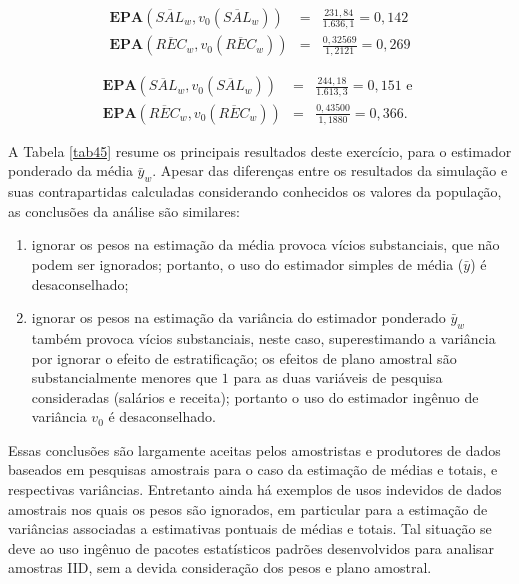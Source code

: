 \documentclass[]{book}
\numberwithin{example}{chapter}
\numberwithin{remark}{chapter}
\numberwithin{definition}{chapter}
\begin{document}
\begin{eqnarray*}
\mathbf{EPA}\left(\overline{SAL}_{w},v_{0}\left(\overline{SAL}_{w}\right)\right) &=&\frac{231,84}{1.636,1}=0,142 \\
\mathbf{EPA}\left( \overline{REC}_{w},v_{0}\left( \overline{REC}_{w}\right)
\right) &=&\frac{0,32569}{1,2121}=0,269
\end{eqnarray*}

\begin{eqnarray*}
\mathbf{EPA}\left( \overline{SAL}_{w},v_{0}\left( \overline{SAL}_{w}\right)
\right) &=&\frac{244,18}{1.613,3}=0,151\mbox{ e } \\
\mathbf{EPA}\left( \overline{REC}_{w},v_{0}\left( \overline{REC}_{w}\right)
\right) &=&\frac{0,43500}{1,1880}=0,366.
\end{eqnarray*}

A Tabela \ref{tab45} resume os principais resultados deste exercício,
para o estimador ponderado da média \(\bar{y}_{w}\). Apesar das
diferenças entre os resultados da simulação e suas contrapartidas
calculadas considerando conhecidos os valores da população, as
conclusões da análise são similares:

\begin{enumerate}
\def\labelenumi{\arabic{enumi}.}
\item
  ignorar os pesos na estimação da média provoca vícios substanciais,
  que não podem ser ignorados; portanto, o uso do estimador simples de
  média (\(\bar{y}\)) é desaconselhado;
\item
  ignorar os pesos na estimação da variância do estimador ponderado
  \(\bar{y}_{w}\) também provoca vícios substanciais, neste caso,
  superestimando a variância por ignorar o efeito de estratificação; os
  efeitos de plano amostral são substancialmente menores que \(1\) para
  as duas variáveis de pesquisa consideradas (salários e receita);
  portanto o uso do estimador ingênuo de variância \(v_{0}\) é
  desaconselhado.
\end{enumerate}

Essas conclusões são largamente aceitas pelos amostristas e produtores
de dados baseados em pesquisas amostrais para o caso da estimação de
médias e totais, e respectivas variâncias. Entretanto ainda há exemplos
de usos indevidos de dados amostrais nos quais os pesos são ignorados,
em particular para a estimação de variâncias associadas a estimativas
pontuais de médias e totais. Tal situação se deve ao uso ingênuo de
pacotes estatísticos padrões desenvolvidos para analisar amostras IID,
sem a devida consideração dos pesos e plano amostral.
\end{document}
